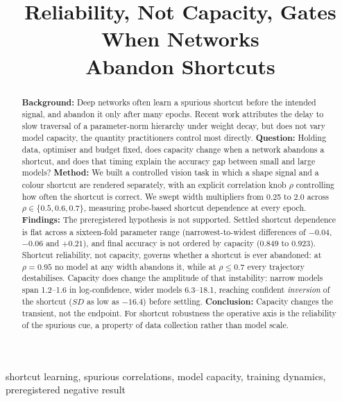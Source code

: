 \documentclass[conference]{IEEEtran}
\begin{document}
\title{Reliability, Not Capacity, Gates When Networks\\Abandon Shortcuts}

\author{
}

\maketitle

\begin{abstract}
\textbf{Background:} Deep networks often learn a spurious shortcut before the intended
signal, and abandon it only after many epochs. Recent work attributes the delay to slow
traversal of a parameter-norm hierarchy under weight decay, but does not vary model
capacity, the quantity practitioners control most directly.
\textbf{Question:} Holding data, optimiser and budget fixed, does capacity change when a
network abandons a shortcut, and does that timing explain the accuracy gap between small
and large models?
\textbf{Method:} We built a controlled vision task in which a shape signal and a colour
shortcut are rendered separately, with an explicit correlation knob $\rho$ controlling how
often the shortcut is correct. We swept width multipliers from 0.25 to 2.0 across
$\rho\in\{0.5,0.6,0.7\}$, measuring probe-based shortcut dependence at every epoch.
\textbf{Findings:} The preregistered hypothesis is not supported. Settled shortcut
dependence is flat across a sixteen-fold parameter range (narrowest-to-widest differences
of $-0.04$, $-0.06$ and $+0.21$), and final accuracy is not ordered by capacity (0.849 to
0.923). Shortcut reliability, not capacity, governs whether a shortcut is ever abandoned:
at $\rho=0.95$ no model at any width abandons it, while at $\rho\le0.7$ every trajectory
destabilises. Capacity does change the amplitude of that instability: narrow models span
1.2--1.6 in log-confidence, wider models 6.3--18.1, reaching confident \emph{inversion} of
the shortcut ($SD$ as low as $-16.4$) before settling.
\textbf{Conclusion:} Capacity changes the transient, not the endpoint. For shortcut
robustness the operative axis is the reliability of the spurious cue, a property of data
collection rather than model scale.
\end{abstract}

\begin{IEEEkeywords}
shortcut learning, spurious correlations, model capacity, training dynamics,
preregistered negative result
\end{IEEEkeywords}
\end{document}
